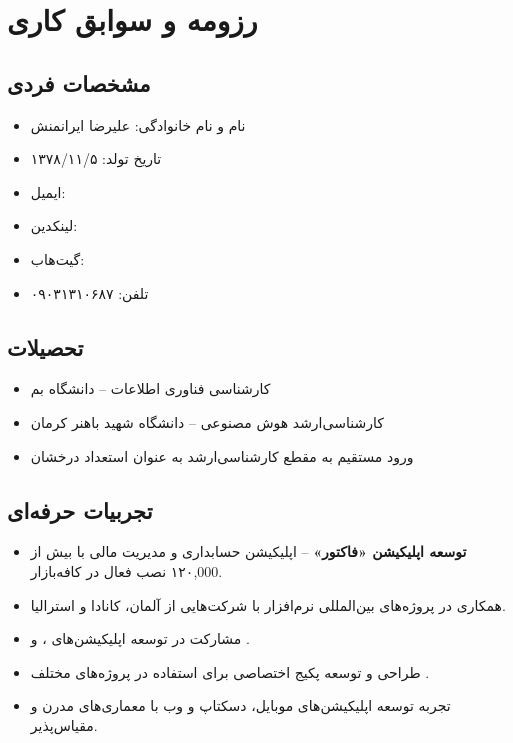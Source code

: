 \chapter{رزومه و سوابق کاری}

\section*{مشخصات فردی}
\begin{itemize}
  \item نام و نام خانوادگی: علیرضا ایرانمنش
  \item تاریخ تولد: ۱۳۷۸/۱۱/۵
  \item ایمیل: 
  \item لینکدین: 
  \item گیت‌هاب: 
  \item تلفن: ۰۹۰۳۱۳۱۰۶۸۷
\end{itemize}

\section*{تحصیلات}
\begin{itemize}
  \item کارشناسی فناوری اطلاعات – دانشگاه بم
  \item کارشناسی‌ارشد هوش مصنوعی – دانشگاه شهید باهنر کرمان
  \item ورود مستقیم به مقطع کارشناسی‌ارشد به عنوان استعداد درخشان
\end{itemize}

\section*{تجربیات حرفه‌ای}
\begin{itemize}
  \item \textbf{توسعه اپلیکیشن «فاکتور»} – اپلیکیشن حسابداری و مدیریت مالی با بیش از ۱۲۰{,}000 نصب فعال در کافه‌بازار.
  \item همکاری در پروژه‌های بین‌المللی نرم‌افزار با شرکت‌هایی از آلمان، کانادا و استرالیا.
  \item مشارکت در توسعه اپلیکیشن‌های ،  و .
  \item طراحی و توسعه پکیج اختصاصی  برای استفاده در پروژه‌های مختلف .
  \item تجربه توسعه اپلیکیشن‌های موبایل، دسکتاپ و وب با معماری‌های مدرن و مقیاس‌پذیر.
\end{itemize}

